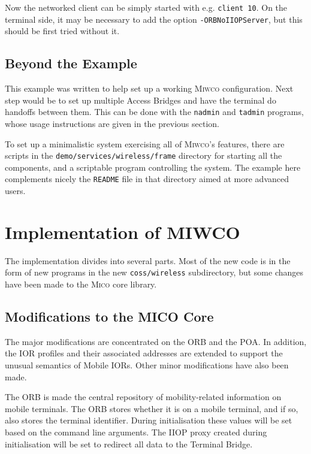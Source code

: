 \documentclass[12pt,a4paper,draft]{article}
\newcommand{\MICO}{\textsc{Mico}}
\newcommand{\MIWCO}{\textsc{Miwco}}
\begin{document}
Now the networked client can be simply started with e.g.
\texttt{client 10}.  On the terminal side, it may be necessary to add
the option \texttt{-ORBNoIIOPServer}, but this should be first tried
without it.

\subsection{Beyond the Example}

This example was written to help set up a working \MIWCO{}
configuration.  Next step would be to set up multiple Access Bridges
and have the terminal do handoffs between them.  This can be done with
the \texttt{nadmin} and \texttt{tadmin} programs, whose usage
instructions are given in the previous section.

To set up a minimalistic system exercising all of \MIWCO{}'s features,
there are scripts in the \texttt{demo/services/wireless/frame}
directory for starting all the components, and a scriptable program
controlling the system.  The example here complements nicely the
\texttt{README} file in that directory aimed at more advanced users.


\section{Implementation of MIWCO}
\label{sec:impl}

The implementation divides into several parts.  Most of the new code
is in the form of new programs in the new \texttt{coss/wireless}
subdirectory, but some changes have been made to the \MICO{} core
library.

\subsection{Modifications to the MICO Core}
\label{sec:core}

The major modifications are concentrated on the ORB and the POA.  In
addition, the IOR profiles and their associated addresses are extended
to support the unusual semantics of Mobile IORs.  Other minor
modifications have also been made.

The ORB is made the central repository of mobility-related information
on mobile terminals.  The ORB stores whether it is on a mobile
terminal, and if so, also stores the terminal identifier.  During
initialisation these values will be set based on the command line
arguments.  The IIOP proxy created during initialisation will be set
to redirect all data to the Terminal Bridge.
\end{document}
